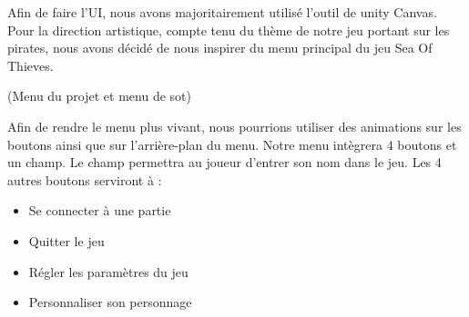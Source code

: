 \documentclass[../doc.tex]{subfiles}
\begin{document}
    Afin de faire l’UI, nous avons majoritairement utilisé l’outil de unity Canvas. 
    Pour la direction artistique, compte tenu du thème de notre jeu portant sur les pirates, 
    nous avons décidé de nous inspirer du menu principal du jeu Sea Of Thieves. \newline
    
    (Menu du projet et menu de sot)
    
    Afin de rendre le menu plus vivant, 
    nous pourrions utiliser des animations sur les boutons ainsi que sur l’arrière-plan du menu.\newline 
    Notre menu intègrera 4 boutons et un champ. Le champ permettra au joueur d’entrer son nom dans le jeu. \newline
    Les 4 autres boutons serviront à :
    \begin{itemize}
        \item Se connecter à une partie
        \item Quitter le jeu
        \item Régler les paramètres du jeu
        \item Personnaliser son personnage
    \end{itemize}
\end{document}
